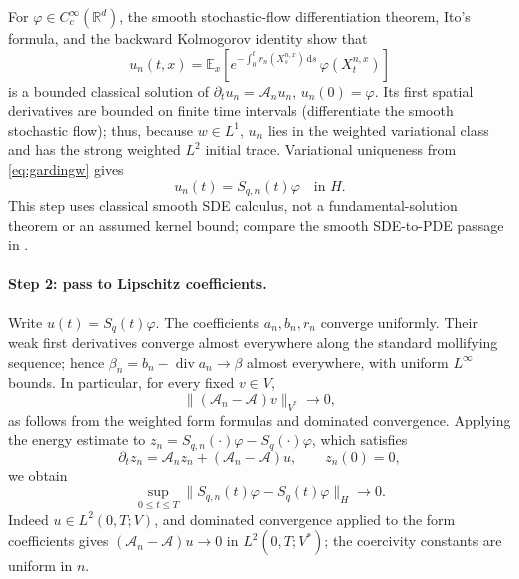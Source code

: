 \documentclass[11pt,a4paper]{article}
\theoremstyle{definition}\newtheorem{definition}{Definition}[section]\newtheorem{example}[theorem]{Example}
\theoremstyle{remark}\newtheorem{remark}[theorem]{Remark}\newtheorem{remarkSix}{Remark}[section]
\newcommand{\Rd}{\mathbb R^d}
\newcommand{\E}{\mathbb E}
\newcommand{\Cc}{C_c^\infty}
\newcommand{\dd}{\,\mathrm d}
\newcommand{\norm}[1]{\lVert #1\rVert}
\newcommand{\cA}{\mathcal A}
\begin{document}
For $\varphi\in\Cc(\Rd)$, the smooth stochastic-flow differentiation theorem, Ito's formula, and the backward Kolmogorov identity show that
\begin{equation}\label{eq:smFK}
 u_n(t,x)=\E_x\left[
 e^{-\int_0^t r_n(X_s^{n,x})\dd s}\,\varphi(X_t^{n,x})\right]
\end{equation}
is a bounded classical solution of $\partial_tu_n=\cA_nu_n$, $u_n(0)=\varphi$. Its first spatial derivatives are bounded on finite time intervals (differentiate the smooth stochastic flow); thus, because $w\in L^1$, $u_n$ lies in the weighted variational class and has the strong weighted $L^2$ initial trace. Variational uniqueness from \eqref{eq:gardingw} gives
\begin{equation}\label{eq:identn}
 u_n(t)=S_{q,n}(t)\varphi\quad\text{in }H.
\end{equation}
This step uses classical smooth SDE calculus, not a fundamental-solution theorem or an assumed kernel bound; compare the smooth SDE-to-PDE passage in \cite[Vol.~II, Ch.~11, \S10]{taylorII}.

\paragraph{Step 2: pass to Lipschitz coefficients.}
Write $u(t)=S_q(t)\varphi$. The coefficients $a_n,b_n,r_n$ converge uniformly. Their weak first derivatives converge almost everywhere along the standard mollifying sequence; hence $\beta_n=b_n-\operatorname{div}a_n\to\beta$ almost everywhere, with uniform $L^\infty$ bounds. In particular, for every fixed $v\in V$,
\begin{equation}\label{eq:formconvergence}
 \norm{(\cA_n-\cA)v}_{V^*}\longrightarrow0,
\end{equation}
as follows from the weighted form formulas and dominated convergence. Applying the energy estimate to $z_n=S_{q,n}(\cdot)\varphi-S_q(\cdot)\varphi$, which satisfies
\begin{equation}\label{eq:stabilityeq}
 \partial_tz_n=\cA_n z_n+(\cA_n-\cA)u,\qquad z_n(0)=0,
\end{equation}
we obtain
\begin{equation}\label{eq:stableH}
 \sup_{0\le t\le T}\norm{S_{q,n}(t)\varphi-S_q(t)\varphi}_H\longrightarrow0.
\end{equation}
Indeed $u\in L^2(0,T;V)$, and dominated convergence applied to the form coefficients gives $(\cA_n-\cA)u\to0$ in $L^2(0,T;V^*)$; the coercivity constants are uniform in $n$.
\end{document}
